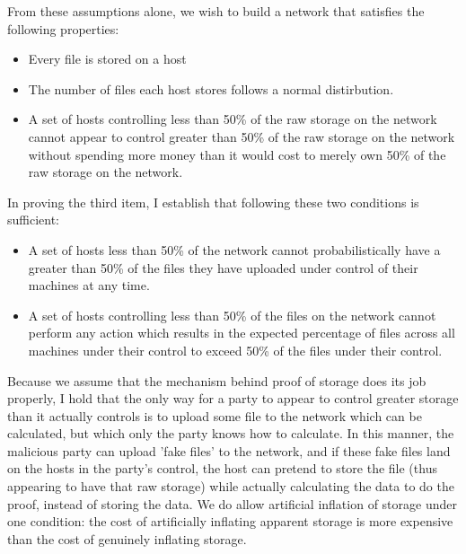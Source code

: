 \documentclass[twocolumn]{article}
\begin{document}
From these assumptions alone, we wish to build a network that satisfies the following properties:
\begin{itemize}
	\item Every file is stored on a host
	\item The number of files each host stores follows a normal distirbution.
	\item A set of hosts controlling less than 50\% of the raw storage on the network cannot appear to control greater than 50\% of the raw storage on the network without spending more money than it would cost to merely own 50\% of the raw storage on the network.
\end{itemize}

In proving the third item, I establish that following these two conditions is sufficient:
\begin{itemize}
	\item A set of hosts less than 50\% of the network cannot probabilistically have a greater than 50\% of the files they have uploaded under control of their machines at any time.
	\item A set of hosts controlling less than 50\% of the files on the network cannot perform any action which results in the expected percentage of files across all machines under their control to exceed 50\% of the files under their control.
\end{itemize}
Because we assume that the mechanism behind proof of storage does its job properly, I hold that the only way for a party to appear to control greater storage than it actually controls is to upload some file to the network which can be calculated, but which only the party knows how to calculate.
In this manner, the malicious party can upload 'fake files' to the network, and if these fake files land on the hosts in the party's control, the host can pretend to store the file (thus appearing to have that raw storage) while actually calculating the data to do the proof, instead of storing the data.
We do allow artificial inflation of storage under one condition: the cost of artificially inflating apparent storage is more expensive than the cost of genuinely inflating storage.
\end{document}
